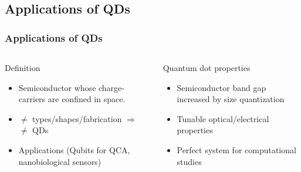 \documentclass[xcolor=pdftex,hyperref={pdfpagelabels=false},table]{beamer}
\begin{document}
\subsection{Applications of QDs}
\begin{frame}
\frametitle{Applications of QDs}
\begin{columns}[T,c]
\column{5cm}
\scriptsize
\begin{block}{Definition}
\begin{itemize}
\item Semiconductor whose charge-carriers are confined in space.
\item $\neq$ types/shapes/fabrication \newline $\Rightarrow$ $\neq$ QDs
\item Applications (Qubits for QCA, nanobiological sensors)
\end{itemize}
  \end{block}

\begin{block}{Quantum dot properties}
\begin{itemize}
\item Semiconductor band gap increased by size quantization
\item Tunable optical/electrical properties
\item Perfect system for computational studies
\end{itemize}
  \end{block}
\column{6cm}
\end{columns}
\end{frame}

\end{document}
